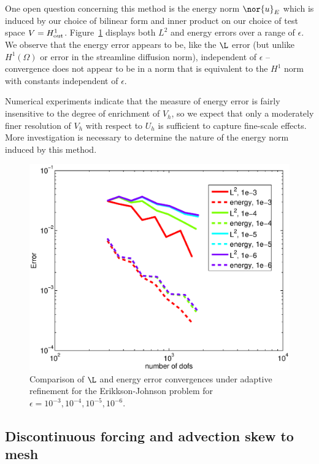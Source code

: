 One open question concerning this method is the energy norm $\nor{u}_E$ which is induced by our choice of bilinear form and inner product on our choice of test space $V = H^1_{\rm out}$.  Figure~\ref{fig:erikksonEpsComparison} displays both $L^2$ and energy errors over a range of $\epsilon$.  We observe that the energy error appears to be, like the $\L$ error (but unlike $H^1(\Omega)$ or error in the streamline diffusion norm), independent of $\epsilon$ -- convergence does not appear to be in a norm that is equivalent to the $H^1$ norm with constants independent of $\epsilon$.  

Numerical experiments indicate that the measure of energy error is fairly insensitive to the degree of enrichment of $V_h$, so we expect that only a moderately finer resolution of $V_h$ with respect to $U_h$ is sufficient to capture fine-scale effects.  More investigation is necessary to determine the nature of the energy norm induced by this method.  

\begin{figure}[!h]
\centering
\includegraphics[scale=.6]{figs/rates/epsRangeComparison.eps}
\caption{Comparison of $\L$ and energy error convergences under adaptive refinement for the Erikkson-Johnson problem for $\epsilon = 10^{-3}, 10^{-4}, 10^{-5}, 10^{-6}$.}
\label{fig:erikksonEpsComparison}
\end{figure}

\subsection{Discontinuous forcing and advection skew to mesh}

